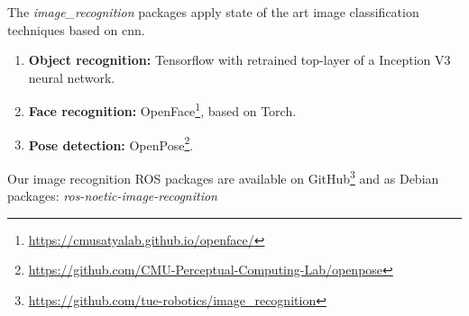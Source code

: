The \emph{image\_recognition} packages apply state of the art image classification techniques based on \acrfull{cnn}.


\begin{enumerate}
\item \textbf{Object recognition:} Tensorflow\texttrademark\hspace{0em} with retrained top-layer of a Inception V3 neural network.

\item \textbf{Face recognition:} OpenFace\footnote{\url{https://cmusatyalab.github.io/openface/}}, based on Torch.

\item \textbf{Pose detection:} OpenPose\footnote{\url{https://github.com/CMU-Perceptual-Computing-Lab/openpose}}.
\end{enumerate}
Our image recognition ROS packages are available on GitHub\footnote{\url{https://github.com/tue-robotics/image_recognition}} and as Debian packages: \emph{ros-noetic-image-recognition}
